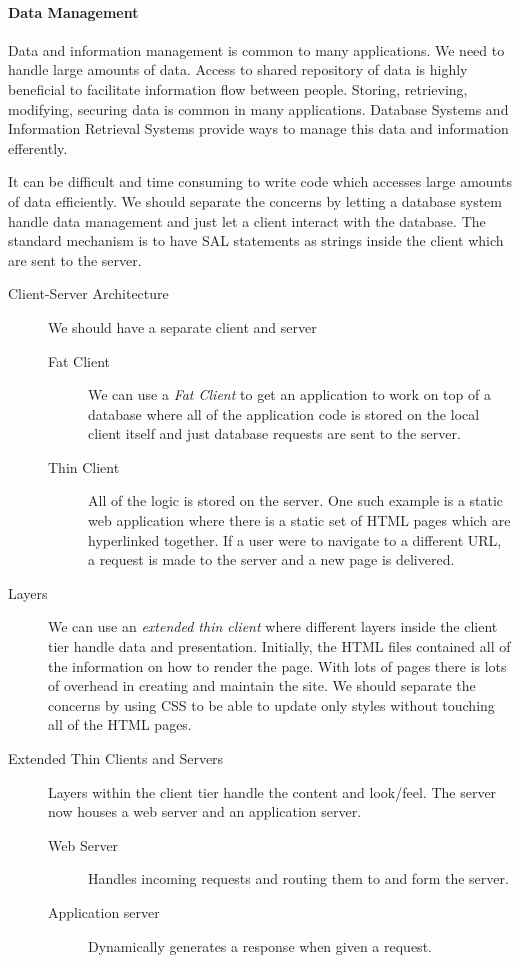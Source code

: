 \paragraph{Data Management}\label{par:data_management}

Data and information management is common to many applications. We need to handle large amounts of data.
Access to shared repository of data is highly beneficial to facilitate information flow between people.
Storing, retrieving, modifying, securing data is common in many applications.
Database Systems and Information Retrieval Systems provide ways to manage this data and information efferently.

It can be difficult and time consuming to write code which accesses large amounts of data efficiently.
We should separate the concerns by letting a database system handle data management and just let a client interact with the database.
The standard mechanism is to have SAL statements as strings inside the client which are sent to the server.

\begin{description}
    \item[Client-Server Architecture] We should have a separate client and server
        \begin{description}
            \item[Fat Client] We can use a \emph{Fat Client} to get an application to work on top of a database where all of the application code is stored on the local client itself and just database requests are sent to the server.
            \item[Thin Client] All of the logic is stored on the server.
                One such example is a static web application where there is a static set of HTML pages which are hyperlinked together.
                If a user were to navigate to a different URL, a request is made to the server and a new page is delivered.
        \end{description}
    \item[Layers] We can use an \emph{extended thin client} where different layers inside the client tier handle data and presentation.
        Initially, the HTML files contained all of the information on how to render the page.
        With lots of pages there is lots of overhead in creating and maintain the site.
        We should separate the concerns by using CSS to be able to update only styles without touching all of the HTML pages.
    \item[Extended Thin Clients and Servers] Layers within the client tier handle the content and look/feel.
        The server now houses a web server and an application server.
        \begin{description}
            \item[Web Server] Handles incoming requests and routing them to and form the server.
            \item[Application server] Dynamically generates a response when given a request.
        \end{description}
\end{description}

